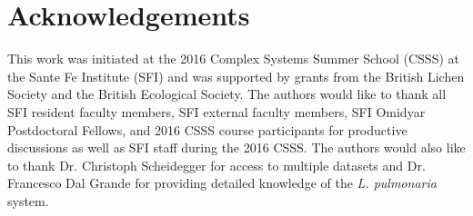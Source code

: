 \documentclass[runningheads,a4paper]{llncs}
\begin{document}
%

%

%

\section*{Acknowledgements}
This work was initiated at the 2016 Complex Systems Summer School (CSSS) at the Sante Fe Institute (SFI) and was supported by grants from the British Lichen Society and the British Ecological Society. The authors would like to thank all SFI resident faculty members, SFI external faculty members, SFI Omidyar Postdoctoral Fellows, and 2016 CSSS course participants for productive discussions as well as SFI staff during the 2016 CSSS. The authors would also like to thank Dr. Christoph Scheidegger for access to multiple datasets and Dr. Francesco Dal Grande for providing detailed knowledge of the \emph{L. pulmonaria} system. 




\end{document}
